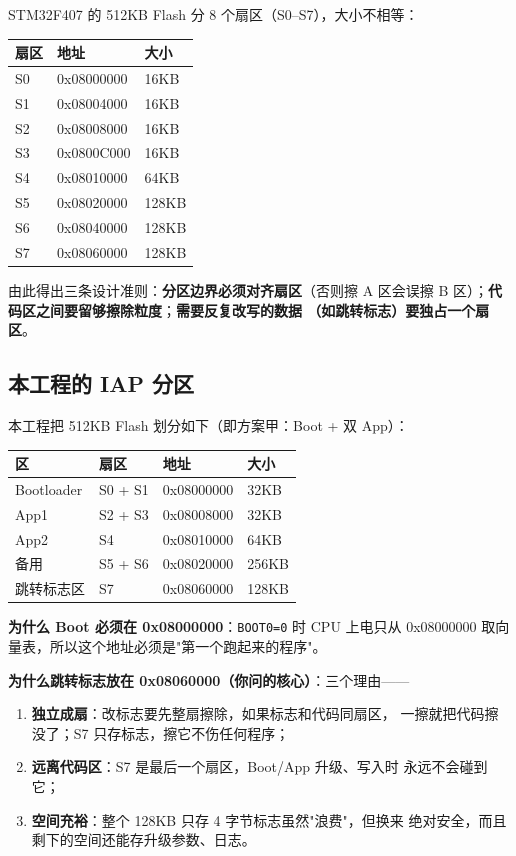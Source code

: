 STM32F407 的 512KB Flash 分 8 个扇区（S0--S7），大小不相等：

\begin{tabular}{lll}
\toprule
\textbf{扇区} & \textbf{地址} & \textbf{大小} \\
\midrule
S0 & 0x08000000 & 16KB \\
S1 & 0x08004000 & 16KB \\
S2 & 0x08008000 & 16KB \\
S3 & 0x0800C000 & 16KB \\
S4 & 0x08010000 & 64KB \\
S5 & 0x08020000 & 128KB \\
S6 & 0x08040000 & 128KB \\
S7 & 0x08060000 & 128KB \\
\bottomrule
\end{tabular}

由此得出三条设计准则：\textbf{分区边界必须对齐扇区}（否则擦 A 区会误擦
B 区）；\textbf{代码区之间要留够擦除粒度}；\textbf{需要反复改写的数据
（如跳转标志）要独占一个扇区}。

\subsection{本工程的 IAP 分区}

本工程把 512KB Flash 划分如下（即方案甲：Boot + 双 App）：

\begin{tabular}{llll}
\toprule
\textbf{区} & \textbf{扇区} & \textbf{地址} & \textbf{大小} \\
\midrule
Bootloader & S0 + S1 & 0x08000000 & 32KB \\
App1 & S2 + S3 & 0x08008000 & 32KB \\
App2 & S4 & 0x08010000 & 64KB \\
备用 & S5 + S6 & 0x08020000 & 256KB \\
跳转标志区 & S7 & 0x08060000 & 128KB \\
\bottomrule
\end{tabular}

\textbf{为什么 Boot 必须在 0x08000000}：\texttt{BOOT0=0} 时 CPU 上电只从
0x08000000 取向量表，所以这个地址必须是"第一个跑起来的程序"。

\textbf{为什么跳转标志放在 0x08060000（你问的核心）}：三个理由——

\begin{enumerate}
  \item \textbf{独立成扇}：改标志要先整扇擦除，如果标志和代码同扇区，
        一擦就把代码擦没了；S7 只存标志，擦它不伤任何程序；
  \item \textbf{远离代码区}：S7 是最后一个扇区，Boot/App 升级、写入时
        永远不会碰到它；
  \item \textbf{空间充裕}：整个 128KB 只存 4 字节标志虽然"浪费"，但换来
        绝对安全，而且剩下的空间还能存升级参数、日志。
\end{enumerate}

